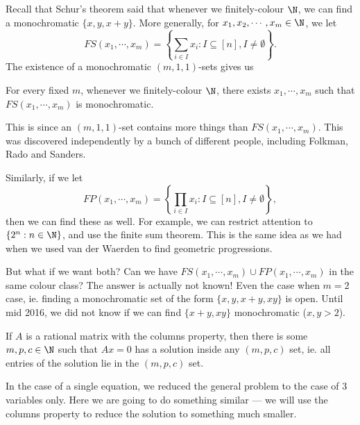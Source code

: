 \documentclass[a4paper]{article}
\begin{document}
Recall that Schur's theorem said that whenever we finitely-colour $\N$, we can find a monochromatic $\{x, y , x + y\}$. More generally, for $x_1, x_2, \cdots, x_m \in \N$, we let
\[
  FS(x_1, \cdots, x_m) = \left\{\sum_{i \in I} x_i : I \subseteq [n], I \not= \emptyset\right\}.
\]
The existence of a monochromatic $(m, 1, 1)$-sets gives us
\begin{cor}
  For every fixed $m$, whenever we finitely-colour $\N$, there exists $x_1, \cdots, x_m$ such that $FS(x_1, \cdots, x_m)$ is monochromatic.
\end{cor}
This is since an $(m, 1, 1)$-set contains more things than $FS(x_1, \cdots, x_m)$. This was discovered independently by a bunch of different people, including Folkman, Rado and Sanders.

Similarly, if we let
\[
  FP(x_1, \cdots, x_m) = \left\{\prod_{i \in I} x_i : I \subseteq [n], I \not= \emptyset\right\},
\]
then we can find these as well. For example, we can restrict attention to $\{2^n: n \in \N\}$, and use the finite sum theorem. This is the same idea as we had when we used van der Waerden to find geometric progressions.

But what if we want both? Can we have $FS(x_1,\cdots, x_m) \cup FP(x_1, \cdots, x_m)$ in the same colour class? The answer is actually not known! Even the case when $m = 2$ case, ie. finding a monochromatic set of the form $\{x, y, x + y, xy\}$ is open. Until mid 2016, we did not know if we can find $\{x + y, xy\}$ monochromatic ($x, y > 2$).

\begin{prop}
  If $A$ is a rational matrix with the columns property, then there is some $m, p, c \in \N$ such that $Ax = 0$ has a solution inside any $(m, p, c)$ set, ie. all entries of the solution lie in the $(m, p, c)$ set.
\end{prop}
In the case of a single equation, we reduced the general problem to the case of 3 variables only. Here we are going to do something similar --- we will use the columns property to reduce the solution to something much smaller.
\end{document}
